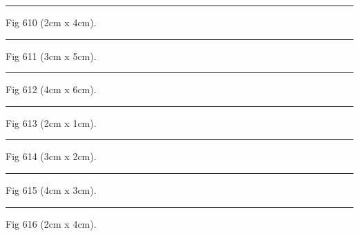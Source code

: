 \documentclass[a4paper,11pt]{article}
\begin{document}
\begin{swarmwrap}%
  \begin{minipage}[t]{2cm}
    \centering
    \rule{\linewidth}{4cm}
    {\footnotesize Fig 610 (2cm x 4cm).}
  \end{minipage}%
\end{swarmwrap}%
\swarmwrapnext
\lipsum[10]%

\begin{swarmwrap}%
  \begin{minipage}[t]{3cm}
    \centering
    \rule{\linewidth}{5cm}
    {\footnotesize Fig 611 (3cm x 5cm).}
  \end{minipage}%
\end{swarmwrap}%
\swarmwrapnext
\lipsum[11]%

\begin{swarmwrap}%
  \begin{minipage}[t]{4cm}
    \centering
    \rule{\linewidth}{6cm}
    {\footnotesize Fig 612 (4cm x 6cm).}
  \end{minipage}%
\end{swarmwrap}%
\swarmwrapnext
\lipsum[12]%

\begin{swarmwrap}%
  \begin{minipage}[t]{2cm}
    \centering
    \rule{\linewidth}{1cm}
    {\footnotesize Fig 613 (2cm x 1cm).}
  \end{minipage}%
\end{swarmwrap}%
\swarmwrapnext
\lipsum[13]%

\begin{swarmwrap}%
  \begin{minipage}[t]{3cm}
    \centering
    \rule{\linewidth}{2cm}
    {\footnotesize Fig 614 (3cm x 2cm).}
  \end{minipage}%
\end{swarmwrap}%
\swarmwrapnext
\lipsum[14]%

\begin{swarmwrap}%
  \begin{minipage}[t]{4cm}
    \centering
    \rule{\linewidth}{3cm}
    {\footnotesize Fig 615 (4cm x 3cm).}
  \end{minipage}%
\end{swarmwrap}%
\swarmwrapnext
\lipsum[15]%

\begin{swarmwrap}%
  \begin{minipage}[t]{2cm}
    \centering
    \rule{\linewidth}{4cm}
    {\footnotesize Fig 616 (2cm x 4cm).}
  \end{minipage}%
\end{swarmwrap}%
\swarmwrapnext
\lipsum[16]%
\end{document}

